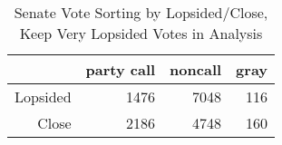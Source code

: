 \documentclass[12pt]{article}
\begin{document}
\begin{table}[ht]
	\centering
	\caption{Senate Vote Sorting by Lopsided/Close, Keep Very Lopsided Votes in Analysis}
	\begin{tabular}{rrrr}
		\hline
		& party call  & noncall & gray \\
		\hline
		Lopsided & 1476 & 7048 & 116 \\
		Close & 2186 & 4748 & 160 \\
		\hline
	\end{tabular}
\end{table}
\end{document}
